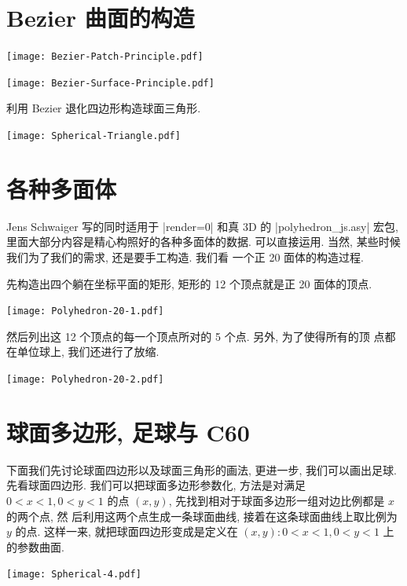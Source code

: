 \documentclass[nofonts,CJKnormalspaces]{ctexbook}[2009/05/20]
\begin{document}
\section{Bezier 曲面的构造}
\begin{center}\texttt{[image: Bezier-Patch-Principle.pdf]}\end{center}%

\begin{center}\texttt{[image: Bezier-Surface-Principle.pdf]}\end{center}%

利用 Bezier 退化四边形构造球面三角形.
\begin{center}\texttt{[image: Spherical-Triangle.pdf]}\end{center}%


\section{各种多面体}
Jens Schwaiger 写的同时适用于 |render=0| 和真 3D 的
|polyhedron_js.asy| 宏包, 里面大部分内容是精心构照好的各种多面体的数据.
可以直接运用. 当然, 某些时候我们为了我们的需求, 还是要手工构造. 我们看
一个正 20 面体的构造过程.

先构造出四个躺在坐标平面的矩形, 矩形的 12 个顶点就是正 20 面体的顶点.
\begin{center}\texttt{[image: Polyhedron-20-1.pdf]}\end{center}%


然后列出这 12 个顶点的每一个顶点所对的 5 个点. 另外, 为了使得所有的顶
点都在单位球上, 我们还进行了放缩.
\begin{center}\texttt{[image: Polyhedron-20-2.pdf]}\end{center}%



\section{球面多边形, 足球与 C60}
下面我们先讨论球面四边形以及球面三角形的画法, 更进一步, 我们可以画出足球.
先看球面四边形. 我们可以把球面多边形参数化, 方法是对满足 $0<x<1,0<y<1$
的点 $(x,y)$, 先找到相对于球面多边形一组对边比例都是 $x$ 的两个点, 然
后利用这两个点生成一条球面曲线, 接着在这条球面曲线上取比例为 $y$ 的点.
这样一来, 就把球面四边形变成是定义在 $(x,y) : 0<x<1,0<y<1$ 上的参数曲面.
\begin{center}\texttt{[image: Spherical-4.pdf]}\end{center}%

\end{document}

